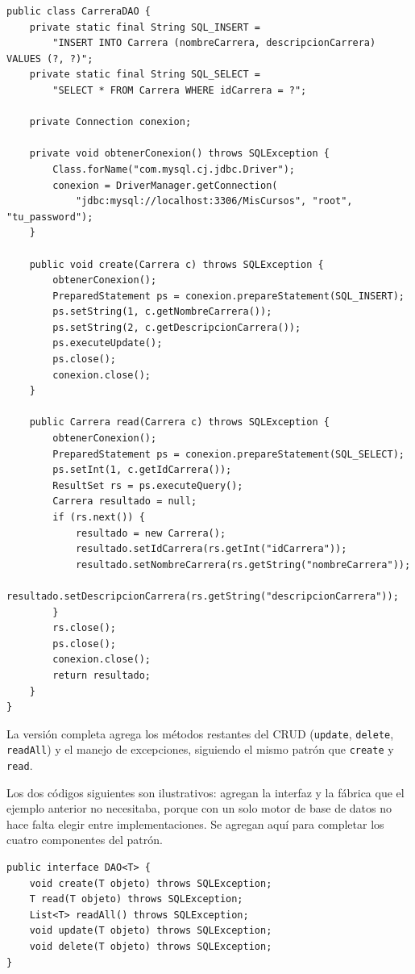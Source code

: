 \documentclass[10pt,a4paper]{article}
\begin{document}
\begin{lstlisting}[caption={DAO Implementation: CarreraDAO.java (fragmento con create y read)}]
public class CarreraDAO {
    private static final String SQL_INSERT =
        "INSERT INTO Carrera (nombreCarrera, descripcionCarrera) VALUES (?, ?)";
    private static final String SQL_SELECT =
        "SELECT * FROM Carrera WHERE idCarrera = ?";

    private Connection conexion;

    private void obtenerConexion() throws SQLException {
        Class.forName("com.mysql.cj.jdbc.Driver");
        conexion = DriverManager.getConnection(
            "jdbc:mysql://localhost:3306/MisCursos", "root", "tu_password");
    }

    public void create(Carrera c) throws SQLException {
        obtenerConexion();
        PreparedStatement ps = conexion.prepareStatement(SQL_INSERT);
        ps.setString(1, c.getNombreCarrera());
        ps.setString(2, c.getDescripcionCarrera());
        ps.executeUpdate();
        ps.close();
        conexion.close();
    }

    public Carrera read(Carrera c) throws SQLException {
        obtenerConexion();
        PreparedStatement ps = conexion.prepareStatement(SQL_SELECT);
        ps.setInt(1, c.getIdCarrera());
        ResultSet rs = ps.executeQuery();
        Carrera resultado = null;
        if (rs.next()) {
            resultado = new Carrera();
            resultado.setIdCarrera(rs.getInt("idCarrera"));
            resultado.setNombreCarrera(rs.getString("nombreCarrera"));
            resultado.setDescripcionCarrera(rs.getString("descripcionCarrera"));
        }
        rs.close();
        ps.close();
        conexion.close();
        return resultado;
    }
}
\end{lstlisting}

La versión completa agrega los métodos restantes del CRUD (\texttt{update}, \texttt{delete}, \texttt{readAll}) y el manejo de excepciones, siguiendo el mismo patrón que \texttt{create} y \texttt{read}.

Los dos códigos siguientes son ilustrativos: agregan la interfaz y la fábrica que el ejemplo anterior no necesitaba, porque con un solo motor de base de datos no hace falta elegir entre implementaciones. Se agregan aquí para completar los cuatro componentes del patrón.

\begin{lstlisting}[caption={DAO Interface ilustrativa}]
public interface DAO<T> {
    void create(T objeto) throws SQLException;
    T read(T objeto) throws SQLException;
    List<T> readAll() throws SQLException;
    void update(T objeto) throws SQLException;
    void delete(T objeto) throws SQLException;
}
\end{lstlisting}
\end{document}
